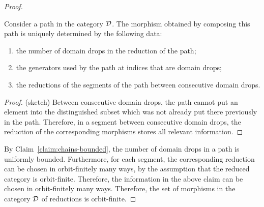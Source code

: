\begin{proof}
        \begin{claim}
                Consider a path in the category ${\mathcal D}$. The morphism obtained by composing this path  is uniquely determined by the following data:
     \begin{enumerate}
        \item the number  of domain drops in the reduction of the path;
        \item the generators used by the path at indices that are domain drops;
        \item the reductions of the  segments of the path  between consecutive domain drops.
     \end{enumerate}
        \end{claim}
        \begin{proof}
            (sketch) Between consecutive domain drops, the path cannot put an element into the distinguished subset which was not already put there previously in the path. Therefore, in a segment between consecutive domain drops, the reduction of the corresponding morphisms stores all relevant information. 
        \end{proof}

    By Claim~\ref{claim:chains-bounded}, the number of domain drops in a path is uniformly bounded. Furthermore, for each segment, the corresponding reduction can be chosen in orbit-finitely many ways, by the assumption that the reduced category is orbit-finite. Therefore, the information in the above claim can be chosen in orbit-finitely many ways. Therefore, the set of morphisms in the category ${\mathcal D}$ of reductions is orbit-finite.
\end{proof}


